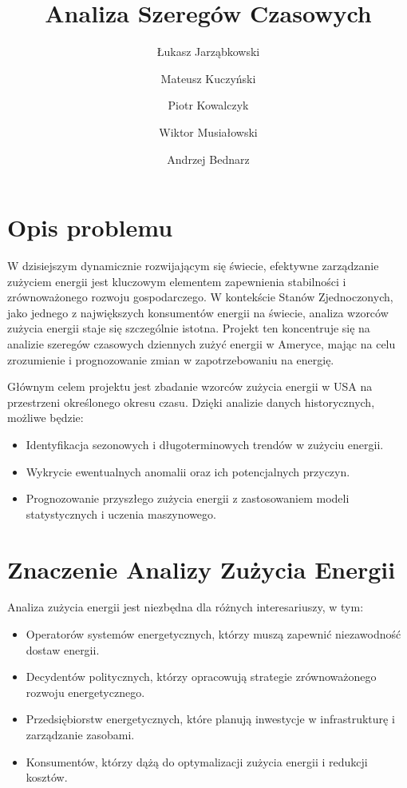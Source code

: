 \documentclass{article}
\begin{document}
\title{Analiza Szeregów Czasowych}
\author{
    Łukasz Jarząbkowski \and
    Mateusz Kuczyński \and
    Piotr Kowalczyk \and
    Wiktor Musiałowski \and
    Andrzej Bednarz
}
\date{} %

\maketitle
\thispagestyle{empty} %
\newpage 

\section{Opis problemu}

W dzisiejszym dynamicznie rozwijającym się świecie, efektywne zarządzanie zużyciem energii jest kluczowym elementem zapewnienia stabilności i zrównoważonego rozwoju gospodarczego. W kontekście Stanów Zjednoczonych, jako jednego z największych konsumentów energii na świecie, analiza wzorców zużycia energii staje się szczególnie istotna. Projekt ten koncentruje się na analizie szeregów czasowych dziennych zużyć energii w Ameryce, mając na celu zrozumienie i prognozowanie zmian w zapotrzebowaniu na energię.

Głównym celem projektu jest zbadanie wzorców zużycia energii w USA na przestrzeni określonego okresu czasu. Dzięki analizie danych historycznych, możliwe będzie:

\begin{itemize}
    \item Identyfikacja sezonowych i długoterminowych trendów w zużyciu energii.
    \item Wykrycie ewentualnych anomalii oraz ich potencjalnych przyczyn.
    \item Prognozowanie przyszłego zużycia energii z zastosowaniem modeli statystycznych i uczenia maszynowego.
\end{itemize}

\section{Znaczenie Analizy Zużycia Energii}

Analiza zużycia energii jest niezbędna dla różnych interesariuszy, w tym:

\begin{itemize}
    \item Operatorów systemów energetycznych, którzy muszą zapewnić niezawodność dostaw energii.
    \item Decydentów politycznych, którzy opracowują strategie zrównoważonego rozwoju energetycznego.
    \item Przedsiębiorstw energetycznych, które planują inwestycje w infrastrukturę i zarządzanie zasobami.
    \item Konsumentów, którzy dążą do optymalizacji zużycia energii i redukcji kosztów.
\end{itemize}
\end{document}
